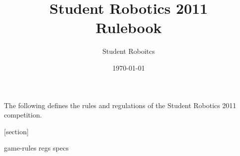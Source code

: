 \documentclass[a4paper, 12pt]{article}
\author{Student Roboitcs}
\title {Student Robotics 2011\\ Rulebook}
\date{\today}
\begin{document}
\maketitle

\noindent The following defines the rules and regulations of the Student Robotics 2011 competition.

[section]
\newcommand{\rcn}{\stepcounter{rule}\arabic{section}.\arabic{rule}}
\renewcommand{\labelenumi}{\rcn}

 {game-rules}
\newpage
 {regs}
\newpage
 {specs}

\end{document}
